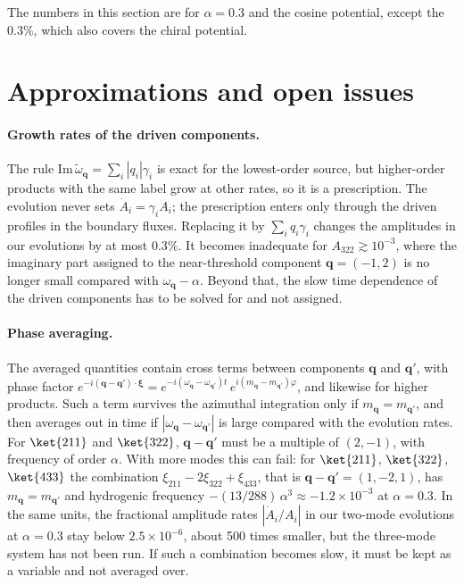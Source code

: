The numbers in this section are for $\alpha=0.3$ and the cosine potential, except the $0.3\%$, which also covers the chiral potential.


\section{Approximations and open issues}\label{sec:open_issues}

\paragraph{Growth rates of the driven components.} The rule $\mathrm{Im}\,\tilde\omega_{\mathbf q}=\sum_i|q_i|\gamma_i$ is exact for the lowest-order source, but higher-order products with the same label grow at other rates, so it is a prescription. The evolution never sets $\dot A_i=\gamma_iA_i$; the prescription enters only through the driven profiles in the boundary fluxes. Replacing it by $\sum_iq_i\gamma_i$ changes the amplitudes in our evolutions by at most $0.3\%$. It becomes inadequate for $A_{322}\gtrsim10^{-3}$, where the imaginary part assigned to the near-threshold component $\mathbf q=(-1,2)$ is no longer small compared with $\omega_{\mathbf q}-\alpha$. Beyond that, the slow time dependence of the driven components has to be solved for and not assigned.

\paragraph{Phase averaging.} The averaged quantities contain cross terms between components $\mathbf{q}$ and $\mathbf{q}'$, with phase factor $e^{-i(\mathbf{q}-\mathbf{q}')\cdot\boldsymbol{\xi}}=e^{-i(\omega_\mathbf{q}-\omega_{\mathbf{q}'})t}\,e^{i(m_\mathbf{q}-m_{\mathbf{q}'})\varphi}$, and likewise for higher products. Such a term survives the azimuthal integration only if $m_\mathbf{q}=m_{\mathbf{q}'}$, and then averages out in time if $|\omega_\mathbf{q}-\omega_{\mathbf{q}'}|$ is large compared with the evolution rates. For $\ket{211}$ and $\ket{322}$, $\mathbf{q}-\mathbf{q}'$ must be a multiple of $(2,-1)$, with frequency of order $\alpha$. With more modes this can fail: for $\ket{211}$, $\ket{322}$, $\ket{433}$ the combination $\xi_{211}-2\xi_{322}+\xi_{433}$, that is $\mathbf{q}-\mathbf{q}'=(1,-2,1)$, has $m_\mathbf{q}=m_{\mathbf{q}'}$ and hydrogenic frequency $-(13/288)\,\alpha^3\approx-1.2\times10^{-3}$ at $\alpha=0.3$. In the same units, the fractional amplitude rates $|\dot A_i/A_i|$ in our two-mode evolutions at $\alpha=0.3$ stay below $2.5\times10^{-6}$, about 500 times smaller, but the three-mode system has not been run. If such a combination becomes slow, it must be kept as a variable and not averaged over.

